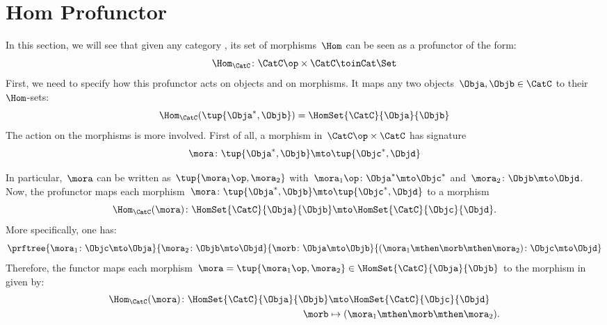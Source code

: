 \section{Hom Profunctor}


In this section, we will see that given any category \CatC, its set of morphisms~$\Hom$ can be seen as a profunctor of the form:
\begin{equation}\label{eq:hom-signature}
    \Hom_\CatC\colon \CatC \op \times \CatC \toinCat \Set
\end{equation}
First, we need to specify how this profunctor acts on objects and on morphisms.
It maps any two objects~$\Obja,\Objb\in \CatC$ to their~$\Hom$-sets:
\begin{equation}\label{eq:hom-action}
    \Hom_\CatC(\tup{\Obja^*,\Objb})=\HomSet{\CatC}{\Obja}{\Objb}
\end{equation}
The action on the morphisms is more involved. First of all, a morphism in~$\CatC\op \times \CatC$ has signature~
\begin{equation}\label{eq:hom0}
    \mora \colon \tup{\Obja^*,\Objb}\mto \tup{\Objc^*, \Objd}
\end{equation}

In particular,~$\mora$ can be written as~$\tup{\mora_1\op,\mora_2}$ with~$\mora_1\op\colon \Obja^*\mto \Objc^*$ and~$\mora_2\colon \Objb\mto \Objd$.
Now, the profunctor maps each morphism~$\mora \colon \tup{\Obja^*,\Objb}\mto \tup{\Objc^*, \Objd}$ to a morphism
\begin{equation} \label{eq:hom2}
\Hom_\CatC(\mora)\colon \HomSet{\CatC}{\Obja}{\Objb}\mto \HomSet{\CatC}{\Objc}{\Objd}.
\end{equation}
More specifically, one has:
\begin{equation}\label{eq:hom3}
    \prftree{\mora_1\colon \Objc \mto \Obja}{\mora_2\colon \Objb\mto \Objd}{\morb\colon \Obja\mto \Objb}{(\mora_1\mthen \morb \mthen \mora_2)\colon \Objc\mto \Objd}
\end{equation}
Therefore, the functor maps each morphism~$\mora=\tup{\mora_1\op,\mora_2}\in \HomSet{\CatC}{\Obja}{\Objb}$ to the morphism in \Set given by:
\begin{equation}\label{eq:hom4}
\begin{aligned}
    \Hom_\CatC(\mora)\colon \HomSet{\CatC}{\Obja}{\Objb}&\mto \HomSet{\CatC}{\Objc}{\Objd}\\
    \morb &\mapsto (\mora_1\mthen \morb \mthen \mora_2).
\end{aligned}
\end{equation}

